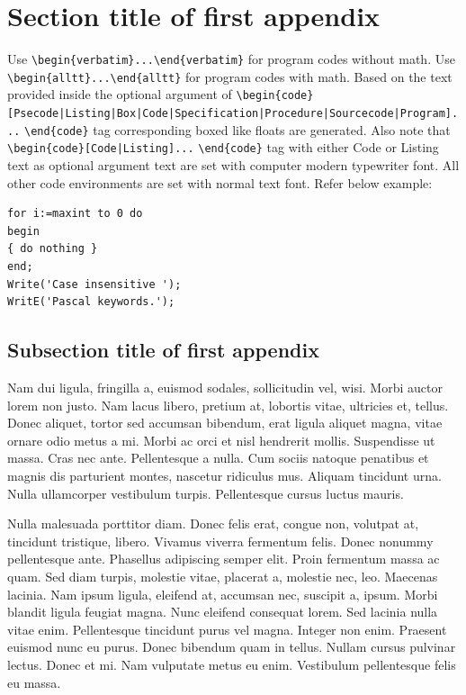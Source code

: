 \documentclass[AMS,STIX2COL]{WileyNJD-v2}
\begin{document}
    \section{Section title of first appendix\label{app1}}

    Use \verb+\begin{verbatim}...\end{verbatim}+ for program codes without math. Use \verb+\begin{alltt}...\end{alltt}+ for program codes with math. Based on the text provided inside the optional argument of \verb+\begin{code}[Psecode|Listing|Box|Code|+\hfill\break \verb+Specification|Procedure|Sourcecode|Program]...+ \verb+\end{code}+ tag corresponding boxed like floats are generated. Also note that \verb+\begin{code}[Code|Listing]...+ \verb+\end{code}+ tag with either Code or Listing text as optional argument text are set with computer modern typewriter font. All other code environments are set with normal text font. Refer below example:

    \begin{lstlisting}[caption={Descriptive Caption Text},label=DescriptiveLabel]
for i:=maxint to 0 do
begin
{ do nothing }
end;
Write('Case insensitive ');
WritE('Pascal keywords.');
    \end{lstlisting}

    \subsection{Subsection title of first appendix\label{app1.1a}}

    Nam dui ligula, fringilla a, euismod sodales, sollicitudin vel, wisi. Morbi auctor lorem non justo. Nam lacus libero,
    pretium at, lobortis vitae, ultricies et, tellus. Donec aliquet, tortor sed accumsan bibendum, erat ligula aliquet magna,
    vitae ornare odio metus a mi. Morbi ac orci et nisl hendrerit mollis. Suspendisse ut massa. Cras nec ante. Pellentesque
    a nulla. Cum sociis natoque penatibus et magnis dis parturient montes, nascetur ridiculus mus. Aliquam tincidunt
    urna. Nulla ullamcorper vestibulum turpis. Pellentesque cursus luctus mauris.

    Nulla malesuada porttitor diam. Donec felis erat, congue non, volutpat at, tincidunt tristique, libero. Vivamus
    viverra fermentum felis. Donec nonummy pellentesque ante. Phasellus adipiscing semper elit. Proin fermentum massa
    ac quam. Sed diam turpis, molestie vitae, placerat a, molestie nec, leo. Maecenas lacinia. Nam ipsum ligula, eleifend
    at, accumsan nec, suscipit a, ipsum. Morbi blandit ligula feugiat magna. Nunc eleifend consequat lorem. Sed lacinia
    nulla vitae enim. Pellentesque tincidunt purus vel magna. Integer non enim. Praesent euismod nunc eu purus. Donec
    bibendum quam in tellus. Nullam cursus pulvinar lectus. Donec et mi. Nam vulputate metus eu enim. Vestibulum
    pellentesque felis eu massa.
\end{document}
